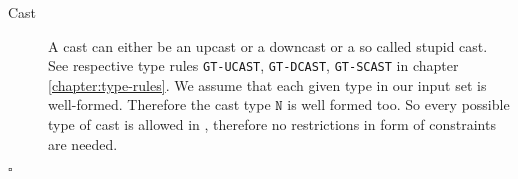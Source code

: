 \begin{description}
\item[Cast]
A cast can either be an upcast or a downcast or a so called stupid cast.
See respective type rules \texttt{GT-UCAST}, \texttt{GT-DCAST}, \texttt{GT-SCAST} in chapter \ref{chapter:type-rules}.
We assume that each given type in our input set is well-formed.
Therefore the cast type $\mathtt{N}$ is well formed too.
So every possible type of cast is allowed in \TFGJ, therefore no restrictions in form of constraints are needed.

\end{description}

\hfill $\square$

